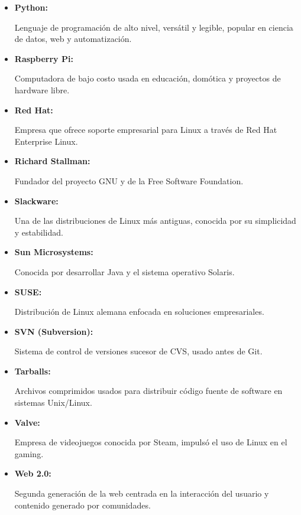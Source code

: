 \documentclass[a4paper,12pt]{article}
\begin{document}
\begin{itemize}
\item \hypertarget{python}{\textbf{Python:}} Lenguaje de programación de alto
nivel, versátil y legible, popular en ciencia de datos, web y automatización.
\label{python}

\item \hypertarget{raspberrypi}{\textbf{Raspberry Pi:}} Computadora de bajo
costo usada en educación, domótica y proyectos de hardware libre.
\label{raspberrypi}

\item \hypertarget{redhat}{\textbf{Red Hat:}} Empresa que ofrece soporte
empresarial para Linux a través de Red Hat Enterprise Linux.  \label{redhat}

\item \hypertarget{richardstallman}{\textbf{Richard Stallman:}} Fundador del
proyecto GNU y de la Free Software Foundation.  \label{richardstallman}

\item \hypertarget{slackware}{\textbf{Slackware:}} Una de las distribuciones de
Linux más antiguas, conocida por su simplicidad y estabilidad.
\label{slackware}

\item \hypertarget{sun}{\textbf{Sun Microsystems:}} Conocida por desarrollar
Java y el sistema operativo Solaris.  \label{sun}

\item \hypertarget{suse}{\textbf{SUSE:}} Distribución de Linux alemana enfocada
en soluciones empresariales.  \label{suse}

\item \hypertarget{svn}{\textbf{SVN (Subversion):}} Sistema de control de
versiones sucesor de CVS, usado antes de Git.  \label{svn}

\item \hypertarget{tarballs}{\textbf{Tarballs:}} Archivos comprimidos usados
para distribuir código fuente de software en sistemas Unix/Linux.
\label{tarballs}

\item \hypertarget{valve}{\textbf{Valve:}} Empresa de videojuegos conocida por
Steam, impulsó el uso de Linux en el gaming.  \label{valve}

\item \hypertarget{web2}{\textbf{Web 2.0:}} Segunda generación de la web
centrada en la interacción del usuario y contenido generado por comunidades.
\label{web2} \end{itemize}
\end{document}

